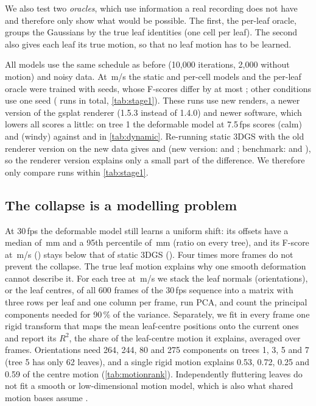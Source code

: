 \documentclass[preprint,11pt,authoryear]{elsarticle}
\begin{document}
We also test two \emph{oracles}, which use information a real recording does not have and therefore only show what would be possible. The first, the per-leaf oracle, groups the Gaussians by the true leaf identities (one cell per leaf). The second also gives each leaf its true motion, so that no leaf motion has to be learned.

All models use the same schedule as before (10{,}000 iterations, 2{,}000 without motion) and noisy data. At \WindMax\,m/s the static and per-cell models and the per-leaf oracle were trained with \SoNSeedsHi{} seeds, whose F-scores differ by at most \SoSeedSdMax{}; other conditions use one seed (\SoNRuns{} runs in total, \cref{tab:stage1}). These runs use new renders, a newer version of the gsplat renderer (1.5.3 instead of 1.4.0) and newer software, which lowers all scores a little: on tree 1 the deformable model at 7.5\,fps scores \SoReproNewCalm{} (calm) and \SoReproNewHi{} (windy) against \SoReproOldCalm{} and \SoReproOldHi{} in \cref{tab:dynamic}. Re-running static 3DGS with the old renderer version on the new data gives \SoChkFourCalm{} and \SoChkFourHi{} (new version: \SoChkFiveCalm{} and \SoChkFiveHi{}; benchmark: \SoChkPaperCalm{} and \SoChkPaperHi{}), so the renderer version explains only a small part of the difference. We therefore only compare runs within \cref{tab:stage1}.

\begin{table}[!tbp]
\centering\small
\caption{Motion models at \WindMax\,m/s (trees 1, 3, 5, 7). ``Wind part of CD'': increase in chamfer distance from calm to wind. Equal median and 95th-percentile offsets mean that all points moved together.}
\label{tab:stage1}
\resizebox{\linewidth}{!}{}
\end{table}

\subsection{The collapse is a modelling problem}
At 30\,fps the deformable model still learns a uniform shift: its offsets have a median of \SoDyOffMed\,mm and a 95th percentile of \SoDyOffPninetyfive\,mm (ratio \SoDyOffRatioMin{} on every tree), and its F-score at \WindMax\,m/s (\SoDyFHi) stays below that of static 3DGS (\SoStFHi). Four times more frames do not prevent the collapse. The true leaf motion explains why one smooth deformation cannot describe it. For each tree at \WindMax\,m/s we stack the leaf normals (orientations), or the leaf centres, of all 600 frames of the 30\,fps sequence into a matrix with three rows per leaf and one column per frame, run PCA, and count the principal components needed for 90\,\% of the variance. Separately, we fit in every frame one rigid transform that maps the mean leaf-centre positions onto the current ones and report its $R^2$, the share of the leaf-centre motion it explains, averaged over frames. Orientations need 264, 244, 80 and 275 components on trees 1, 3, 5 and 7 (tree 5 has only 62 leaves), and a single rigid motion explains 0.53, 0.72, 0.25 and 0.59 of the centre motion (\cref{tab:motionrank}). Independently fluttering leaves do not fit a smooth or low-dimensional motion model, which is also what shared motion bases assume \citep{wang2024shape}.
\end{document}
